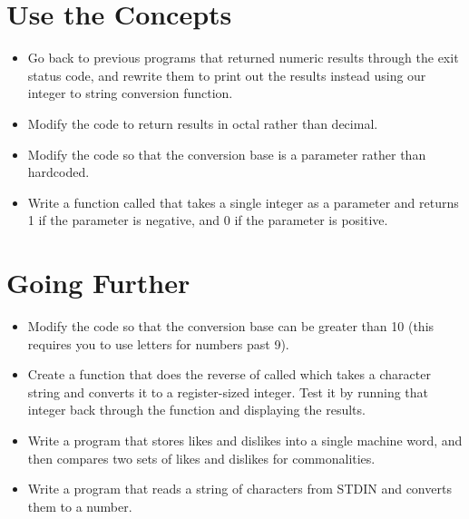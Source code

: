 \section{Use the Concepts}

\begin{itemize}\item Go back to previous programs that returned numeric results through the exit status code, and rewrite them to print out the results instead using our integer to string conversion function. 
\item Modify the  code to return results in octal rather than decimal. 
\item Modify the  code so that the conversion base is a parameter rather than hardcoded. 
\item Write a function called  that takes a single integer as a parameter and returns 1 if the parameter is negative, and 0 if the parameter is positive. 
\end{itemize}

\section{Going Further}

\begin{itemize}\item Modify the  code so that the conversion base can be greater than 10 (this requires you to use letters for numbers past 9). 
\item Create a function that does the reverse of  called  which takes a character string and converts it to a register-sized integer.  Test it by running that integer back through the  function and displaying the results. 
\item Write a program that stores likes and dislikes into a single machine word, and then compares two sets of likes and dislikes for commonalities. 
\item Write a program that reads a string of characters from STDIN and converts them to a number. 
\end{itemize}

